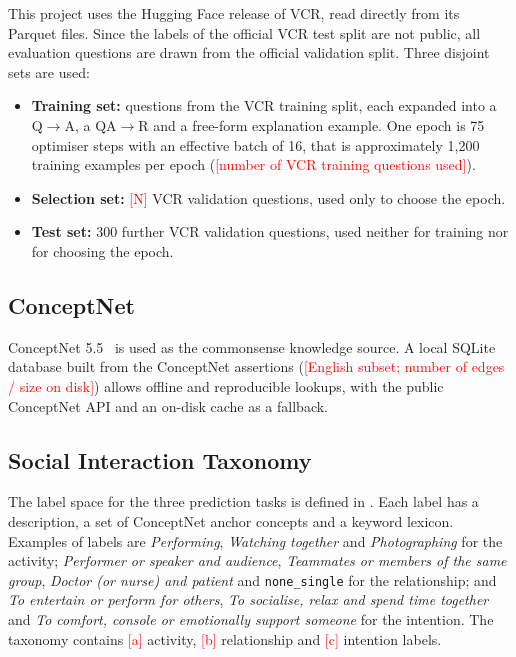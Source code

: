 \documentclass[12pt,a4paper,oneside]{report}
\newcommand{\fillin}[1]{\textcolor{red}{[#1]}}
\newcommand{\QtoA}{Q$\rightarrow$A}
\newcommand{\QAtoR}{QA$\rightarrow$R}
\newcommand{\code}[1]{\texttt{#1}}
\begin{document}
This project uses the Hugging Face release of VCR, read directly from its
Parquet files. Since the labels of the official VCR test split are not public,
all evaluation questions are drawn from the official validation split. Three
disjoint sets are used:

\begin{itemize}[leftmargin=*]
\item \textbf{Training set:} questions from the VCR training split, each
  expanded into a \QtoA, a \QAtoR{} and a free-form explanation example. One
  epoch is 75 optimiser steps with an effective batch of 16, that is
  approximately 1,200 training examples per epoch
  (\fillin{number of VCR training questions used}).
\item \textbf{Selection set:} \fillin{N} VCR validation questions, used only to
  choose the epoch.
\item \textbf{Test set:} 300 further VCR validation questions, used neither for
  training nor for choosing the epoch.
\end{itemize}

\subsection{ConceptNet}

ConceptNet 5.5~\cite{speer2017conceptnet} is used as the commonsense knowledge
source. A local SQLite database built from the ConceptNet assertions
(\fillin{English subset; number of edges / size on disk}) allows offline and
reproducible lookups, with the public ConceptNet API and an on-disk cache as a
fallback.

\subsection{Social Interaction Taxonomy}

The label space for the three prediction tasks is defined in
. Each label has a description, a set of ConceptNet
anchor concepts and a keyword lexicon. Examples of labels are
\emph{Performing}, \emph{Watching together} and \emph{Photographing} for the
activity; \emph{Performer or speaker and audience}, \emph{Teammates or members
of the same group}, \emph{Doctor (or nurse) and patient} and
\code{none\_single} for the relationship; and \emph{To entertain or perform for
others}, \emph{To socialise, relax and spend time together} and \emph{To
comfort, console or emotionally support someone} for the intention. The
taxonomy contains \fillin{a} activity, \fillin{b} relationship and \fillin{c}
intention labels.
\end{document}
